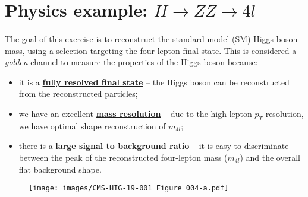 \section{Physics example: $H \rightarrow ZZ \rightarrow 4l$}
\justifying
\paragraph{}
The goal of this exercise is to reconstruct the standard model (SM) Higgs boson mass, using a selection targeting the four-lepton final state. This is considered a \textit{golden} channel to measure the properties of the Higgs boson because:
\begin{itemize}
	\item it is a \textbf{\underline{ fully resolved final state}} -- the Higgs boson can be reconstructed from the reconstructed particles;
	\item we have an excellent \textbf{\underline{ mass resolution}} -- due to the high lepton-$p_T$ resolution, we have optimal shape reconstruction of $m_{4l}$;
	\item there is a \textbf{\underline{ large signal to background ratio}} -- it is easy to discriminate between the peak of the reconstructed four-lepton mass ($m_{4l}$) and the overall flat background shape.
\end{itemize}

\begin{figure}[t]
	\centering
	\texttt{[image: images/CMS-HIG-19-001\_Figure\_004-a.pdf]}
	\label{higgs_plot}
\end{figure}
